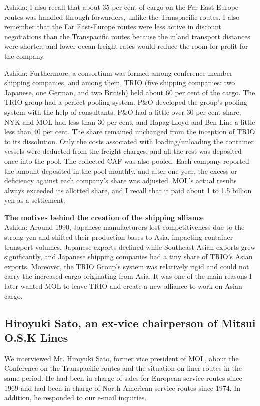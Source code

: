 Ashida: I also recall that about 35 per cent of cargo on the Far East-Europe routes was handled through forwarders, unlike the Transpacific routes. I also remember that the Far East-Europe routes were less active in discount negotiations than the Transpacific routes because the inland transport distances were shorter, and lower ocean freight rates would reduce the room for profit for the company.


Ashida: Furthermore, a consortium was formed among conference member shipping companies, and among them, TRIO (five shipping companies: two Japanese, one German, and two British) held about 60 per cent of the cargo. The TRIO group had a perfect pooling system. P\&O developed the group's pooling system with the help of consultants. P\&O had a little over 30 per cent share, NYK and MOL had less than 30 per cent, and Hapag-Lloyd and Ben Line a little less than 40 per cent. The share remained unchanged from the inception of TRIO to its dissolution. Only the costs associated with loading/unloading the container vessels were deducted from the freight charges, and all the rest was deposited once into the pool. The collected CAF was also pooled. Each company reported the amount deposited in the pool monthly, and after one year, the excess or deficiency against each company's share was adjusted. MOL's actual results always exceeded its allotted share, and I recall that it paid about 1 to 1.5 billion yen as a settlement.

\textbf{The motives behind the creation of the shipping alliance}\\
Ashida: Around 1990, Japanese manufacturers lost competitiveness due to the strong yen and shifted their production bases to Asia, impacting container transport volumes. Japanese exports declined while Southeast Asian exports grew significantly, and Japanese shipping companies had a tiny share of TRIO's Asian exports. Moreover, the TRIO Group's system was relatively rigid and could not carry the increased cargo originating from Asia. It was one of the main reasons I later wanted MOL to leave TRIO and create a new alliance to work on Asian cargo.

\subsection{Hiroyuki Sato, an ex-vice chairperson of Mitsui O.S.K Lines}

We interviewed Mr. Hiroyuki Sato, former vice president of MOL, about the Conference on the Transpacific routes and the situation on liner routes in the same period. He had been in charge of sales for European service routes since 1969 and had been in charge of North American service routes since 1974. In addition, he responded to our e-mail inquiries.\\

